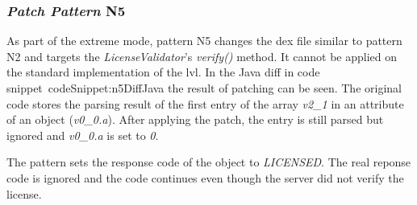 \subsubsection{\textit{Patch Pattern} N5}
As part of the extreme mode, pattern N5 changes the \gls{dex} file similar to pattern N2 and targets the \textit{LicenseValidator}'s \textit{verify()} method.
It cannot be applied on the standard implementation of the \gls{lvl}.
\newline
In the Java diff in code snippet~{codeSnippet:n5DiffJava} the result of patching can be seen.
The original code stores the parsing result of the first entry of the array \textit{v2\_1} in an attribute of an object (\textit{v0\_0.a}).
After applying the patch, the entry is still parsed but ignored and \textit{v0\_0.a} is set to \textit{0}.
\newline

The pattern sets the response code of the object to \textit{LICENSED}.
The real reponse code is ignored and the code continues even though the server did not verify the license.

